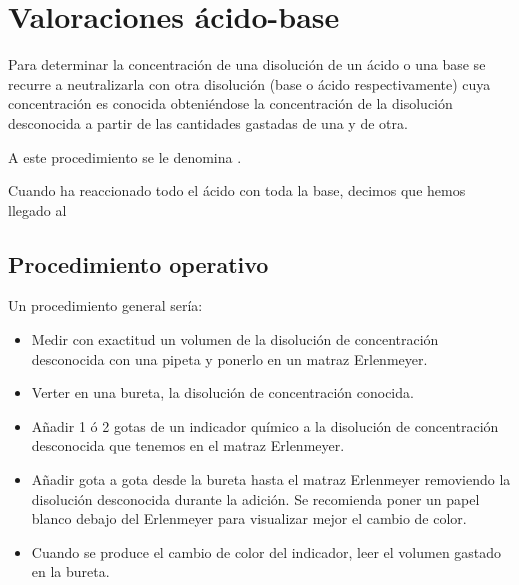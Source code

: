 


    \section{Valoraciones ácido-base}\label{sec:valoraciones-acido-base}

    Para determinar la concentración de una disolución de un ácido o una base se recurre a neutralizarla con otra disolución (base o ácido respectivamente) cuya concentración es conocida obteniéndose la concentración de la disolución desconocida a partir de las cantidades gastadas de una y de otra.

    A este procedimiento se le denomina .

    Cuando ha reaccionado todo el ácido con toda la base, decimos que hemos llegado al 

    \subsection{Procedimiento operativo}\label{subsec:procedimiento-operativo}

    Un procedimiento general sería:
    \begin{itemize}
        \item Medir con exactitud un volumen de la disolución de concentración desconocida con una pipeta y ponerlo en un matraz Erlenmeyer.
        \item Verter en una bureta, la disolución de concentración conocida.
        \item Añadir 1 ó 2 gotas de un indicador químico a la disolución de concentración desconocida que tenemos en el matraz Erlenmeyer.
        \item Añadir gota a gota desde la bureta hasta el matraz Erlenmeyer removiendo la disolución desconocida durante la adición.
        Se recomienda poner un papel blanco debajo del Erlenmeyer para visualizar mejor el cambio de color.
        \item Cuando se produce el cambio de color del indicador, leer el volumen gastado en la bureta.
    \end{itemize}

